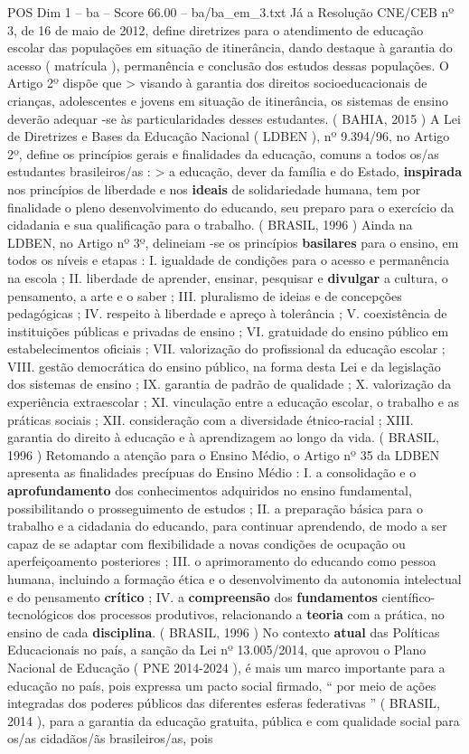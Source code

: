\begin{textsample}{POS Dim 1 – ba – Score 66.00 – ba/ba\_em\_3.txt}
Já a Resolução CNE/CEB nº 3, de 16 de maio de 2012, define diretrizes para o atendimento de educação escolar das populações em situação de itinerância, dando destaque à garantia do acesso ( matrícula ), permanência e conclusão dos estudos dessas populações.
O Artigo 2º dispõe que > visando à garantia dos direitos socioeducacionais de crianças, adolescentes e jovens em situação de itinerância, os sistemas de ensino deverão adequar -se às particularidades desses estudantes. ( BAHIA, 2015 ) A Lei de Diretrizes e Bases da Educação Nacional ( LDBEN ), nº 9.394/96, no Artigo 2º, define os princípios gerais e finalidades da educação, comuns a todos os/as estudantes brasileiros/as : > a educação, dever da família e do Estado, \textbf{inspirada} nos princípios de liberdade e nos \textbf{ideais} de solidariedade humana, tem por finalidade o pleno desenvolvimento do educando, seu preparo para o exercício da cidadania e sua qualificação para o trabalho. ( BRASIL, 1996 ) Ainda na LDBEN, no Artigo nº 3º, delineiam -se os princípios \textbf{basilares} para o ensino, em todos os níveis e etapas : I. igualdade de condições para o acesso e permanência na escola ; II. liberdade de aprender, ensinar, pesquisar e \textbf{divulgar} a cultura, o pensamento, a arte e o saber ; III. pluralismo de ideias e de concepções pedagógicas ; IV. respeito à liberdade e apreço à tolerância ; V. coexistência de instituições públicas e privadas de ensino ; VI. gratuidade do ensino público em estabelecimentos oficiais ; VII. valorização do profissional da educação escolar ; VIII. gestão democrática do ensino público, na forma desta Lei e da legislação dos sistemas de ensino ; IX. garantia de padrão de qualidade ; X. valorização da experiência extraescolar ; XI. vinculação entre a educação escolar, o trabalho e as práticas sociais ; XII. consideração com a diversidade étnico-racial ; XIII. garantia do direito à educação e à aprendizagem ao longo da vida. ( BRASIL, 1996 ) Retomando a atenção para o Ensino Médio, o Artigo nº 35 da LDBEN apresenta as finalidades precípuas do Ensino Médio : I. a consolidação e o \textbf{aprofundamento} dos conhecimentos adquiridos no ensino fundamental, possibilitando o prosseguimento de estudos ; II. a preparação básica para o trabalho e a cidadania do educando, para continuar aprendendo, de modo a ser capaz de se adaptar com flexibilidade a novas condições de ocupação ou aperfeiçoamento posteriores ; III. o aprimoramento do educando como pessoa humana, incluindo a formação ética e o desenvolvimento da autonomia intelectual e do pensamento \textbf{crítico} ; IV. a \textbf{compreensão} dos \textbf{fundamentos} científico-tecnológicos dos processos produtivos, relacionando a \textbf{teoria} com a prática, no ensino de cada \textbf{disciplina}. ( BRASIL, 1996 ) No contexto \textbf{atual} das Políticas Educacionais no país, a sanção da Lei nº 13.005/2014, que aprovou o Plano Nacional de Educação ( PNE 2014-2024 ), é mais um marco importante para a educação no país, pois expressa um pacto social firmado, “ por meio de ações integradas dos poderes públicos das diferentes esferas federativas ” ( BRASIL, 2014 ), para a garantia da educação gratuita, pública e com qualidade social para os/as cidadãos/ãs brasileiros/as, pois 
\end{textsample}
